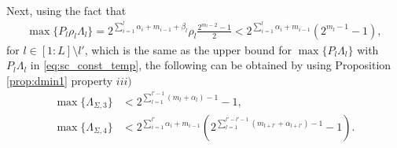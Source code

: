 \documentclass[12pt, draftclsnofoot, onecolumn]{IEEEtran}
\theoremstyle{definition}
\begin{document}
Next, using the fact that
\begin{align}\label{eq:upper_bound_lambda_l}
\max\{P_l\rho_l\Lambda_l \} = 2^{\sum_{i=1}^l\alpha_i+m_{i-1}+\beta_l}\rho_l\frac{2^{m_l-2}-1}{2}<2^{\sum_{i=1}^l\alpha_i+m_{i-1}}(2^{m_l-1}-1),
\end{align}
for $l \in [1:L] \setminus l'$, which is the same as the upper bound for $\max\{P_l\Lambda_l \}$ with $P_l\Lambda_l$ in \eqref{eq:sc_const_temp}, the following can be obtained by using Proposition \ref{prop:dmin1} property $iii)$
\begin{align}
\max\{\Lambda_{\Sigma,3}\} &<2^{\sum_{l=1}^{l'-1}(m_l+\alpha_l)-1}-1,\label{eq:lambda_sigma3b} \\
\max\{\Lambda_{\Sigma,4}\} &< 2^{\sum_{i=1}^{l'}\alpha_i+m_{i-1}}\left(2^{\sum_{l=1}^{\bar{l'}-l'-1}(m_{l+l'}+\alpha_{l+l'})-1}-1\right) .\label{eq:lambda_sigma2_max}
\end{align}
\end{document}
